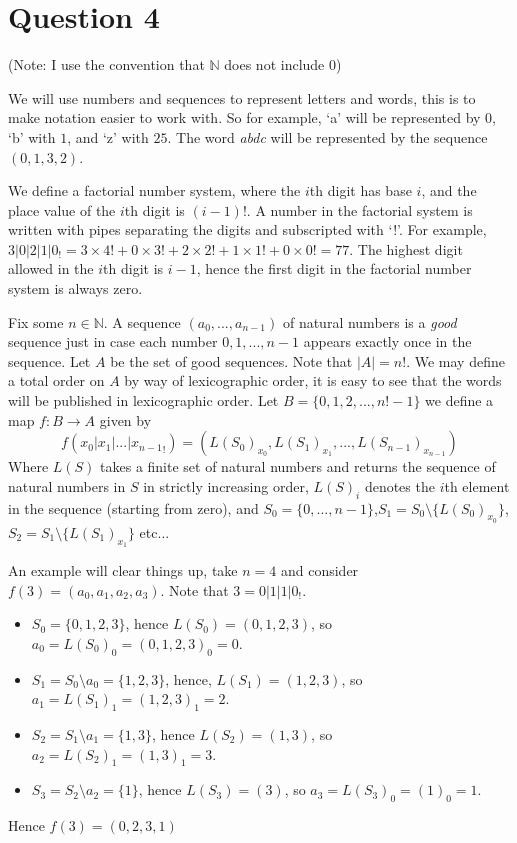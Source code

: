 \documentclass[11pt]{article}
\begin{document}
\section*{Question 4}
(Note: I use the convention that $\mathbb{N}$ does not include $0$)

We will use numbers and sequences to represent letters and words, this is to make notation easier to work with. So for example, `a' will be represented by $0$, `b' with $1$, and `z' with $25$. The word \textit{abdc} will be represented by the sequence $(0,1,3,2)$.

We define a factorial number system, where the $i$th digit has base $i$, and the place value of the $i$th digit is $(i-1)!$. A number in the factorial system is written with pipes separating the digits and subscripted with `!'. For example, $3|0|2|1|0_!=3\times4!+0\times3!+2\times2!+1\times1!+0\times0!=77$. The highest digit allowed in the $i$th digit is $i-1$, hence the first digit in the factorial number system is always zero.

Fix some $n\in\mathbb{N}$. A sequence $(a_0,...,a_{n-1})$ of natural numbers is a \textit{good} sequence just in case each number $0, 1,...,n-1$ appears exactly once in the sequence. Let $A$ be the set of good sequences. Note that $|A|=n!$. We may define a total order on $A$ by way of lexicographic order, it is easy to see that the words will be published in lexicographic order. Let $B=\{0,1,2,...,n!-1\}$ we define a map $f:B\to A$ given by 
\[f(x_0|x_1|...|{x_{n-1}}_!)=(L(S_0)_{x_0},L(S_1)_{x_1},...,L(S_{n-1})_{x_{n-1}})\]
 Where $L(S)$ takes a finite set of natural numbers and returns the sequence of natural numbers in $S$ in strictly increasing order, $L(S)_i$ denotes the $i$th element in the sequence (starting from zero), and $S_0=\{0,...,n-1\}$,$S_1=S_0\setminus\{L(S_0)_{x_0}\}$, $S_2=S_1\setminus\{L(S_1)_{x_1}\}$ etc...

An example will clear things up, take $n=4$ and consider $f(3)=(a_0,a_1,a_2,a_3)$. Note that
$3=0|1|1|0_!$.
\begin{itemize}
	\item $S_0=\{0,1,2,3\}$, hence $L(S_0)=(0,1,2,3)$, so $a_0=L(S_0)_0=(0,1,2,3)_0=0$.
	\item $S_1=S_0\setminus{a_0}=\{1,2,3\}$, hence, $L(S_1)=(1,2,3)$, so $a_1=L(S_1)_1=(1,2,3)_1=2$.
	\item $S_2=S_1\setminus{a_1}=\{1,3\}$, hence $L(S_2)=(1,3)$, so $a_2=L(S_2)_1=(1,3)_1=3$.
	\item $S_3=S_2\setminus{a_2}=\{1\}$, hence $L(S_3)=(3)$, so $a_3=L(S_3)_0=(1)_0=1$.
\end{itemize}
Hence $f(3)=(0,2,3,1)$
\end{document}
